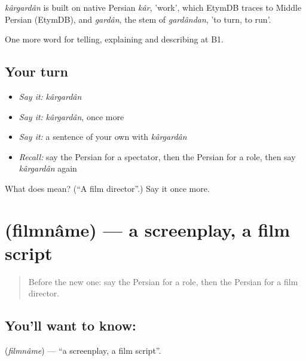 \begin{cousinweb}
\emph{kârgardân} is built on native Persian \emph{kâr}, 'work', which EtymDB traces to Middle Persian (EtymDB), and \emph{gardân}, the stem of \emph{gardândan}, 'to turn, to run'.
\end{cousinweb}

\begin{grammarlens}[title={What you've built}]
One more word for telling, explaining and describing at B1.
\end{grammarlens}

\subsection*{Your turn}
\begin{itemize}
\raggedright
  \item \emph{Say it:} \emph{kârgardân}
  \item \emph{Say it:} \emph{kârgardân}, once more
  \item \emph{Say it:} a sentence of your own with \emph{kârgardân}
  \item \emph{Recall:} say the Persian for a spectator, then the Persian for a role, then say \emph{kârgardân} again
\end{itemize}

\begin{tcolorbox}[breakable,colback=teal!4,colframe=teal!35!black,title={Before you move on}]
What does  mean? (\textquotedblleft{}A film director\textquotedblright{}.) Say it once more.
\end{tcolorbox}
\section[\texorpdfstring{\fa{فیلمنامه} (filmnâme)}{فیلمنامه (filmnâme)}]{ (filmnâme) — a screenplay, a film script}

\label{lesson:FA-C524-filmname}



\begin{quote}
Before the new one: say the Persian for a role, then the Persian for a film director.
\end{quote}

\subsection*{You'll want to know: }
\textbf{} (\emph{filmnâme}) — \textquotedblleft{}a screenplay, a film script\textquotedblright{}.

